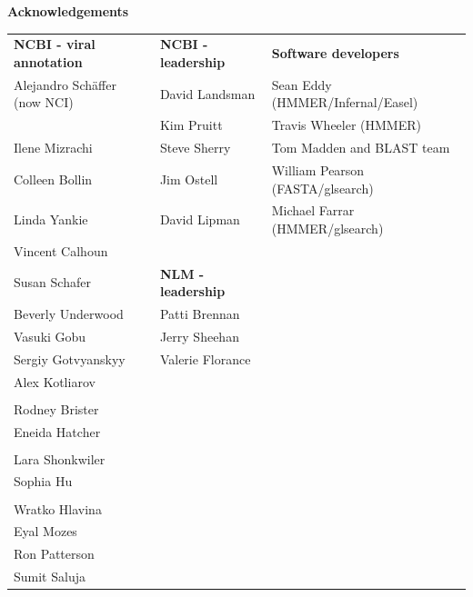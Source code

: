 \documentclass[landscape]{slides}
\begin{document}
\begin{slide}

\large
\begin{center}
\large{\textbf{Acknowledgements}} \\

\normalsize
\vspace{0.75in}

\small
\begin{tabular}{l|l|l}
\textbf{NCBI - viral annotation} & \textbf{NCBI - leadership} &  \textbf{Software developers} \\
Alejandro Sch\"{a}ffer (now NCI) & David Landsman             & Sean Eddy (HMMER/Infernal/Easel)\\
                                 & Kim Pruitt                 & Travis Wheeler (HMMER)\\
Ilene Mizrachi                   & Steve Sherry               & Tom Madden and BLAST team \\
Colleen Bollin                   & Jim Ostell                 & William Pearson (FASTA/glsearch) \\
Linda Yankie                     & David Lipman               & Michael Farrar (HMMER/glsearch) \\
Vincent Calhoun                  &                            & \\
Susan Schafer                    & \textbf{NLM - leadership}  & \\
Beverly Underwood                & Patti Brennan              & \\
Vasuki Gobu                      & Jerry Sheehan              & \\
Sergiy Gotvyanskyy               & Valerie Florance           & \\
Alex Kotliarov                   & & \\
& & \\
Rodney Brister                   & & \\
Eneida Hatcher                   & & \\
& & \\
Lara Shonkwiler                  & & \\
Sophia Hu                        & & \\
& & \\
Wratko Hlavina                   & & \\
Eyal Mozes                       & & \\
Ron Patterson                    & & \\
Sumit Saluja                     & & \\ 
\end{tabular}


\end{center}
\end{slide}
\end{document}
